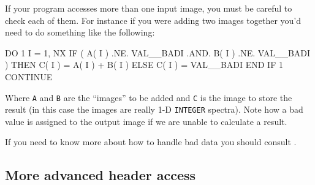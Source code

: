 \documentclass[twoside,11pt,nolof]{starlink}
\providecommand{\myverb}[1]{{\texttt{#1}}}
\newenvironment{code}{\begin{small}}
                     {\end{small}}
\begin{document}
If your program accesses more than one input image, you must be
careful to check each of them. For instance if you were adding two
images together you'd need to do something like the following:
\begin{code}
\begin{terminalv}
      DO 1 I = 1, NX
         IF ( A( I ) .NE. VAL__BADI .AND. B( I ) .NE. VAL__BADI ) THEN
            C( I ) = A( I ) + B( I )
         ELSE
            C( I ) = VAL__BADI
         END IF
 1    CONTINUE
\end{terminalv}
\end{code}

Where \myverb{A} and \myverb{B} are the ``images'' to be added and
\myverb{C} is the image to store the result (in this case the images
are really 1-D \myverb{INTEGER} spectra).
Note how a bad value is assigned to the output image if we are unable
to calculate a result.

If you need to know more about how to handle bad data you should
consult .

\subsection{More advanced header access}
\end{document}
